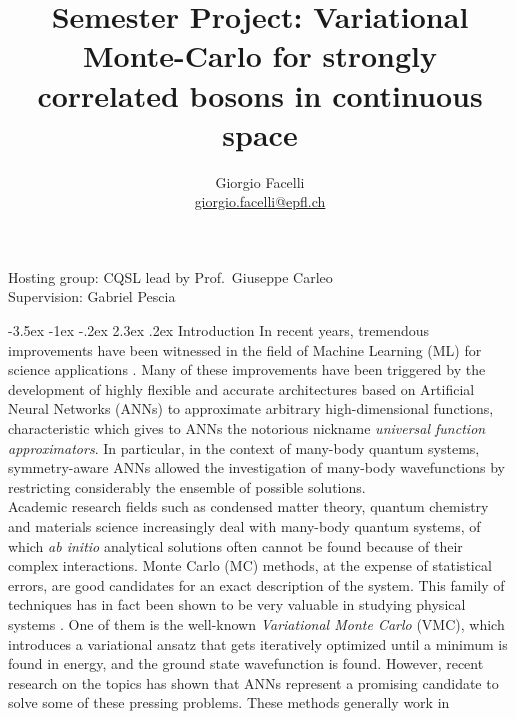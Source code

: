 \documentclass[a4paper, 12pt, oneside]{article}
\makeatletter
\renewcommand{\section}{\@startsection{section}{1}{\z@}%
             {-3.5ex \@plus-1ex \@minus-.2ex}%
             {2.3ex \@plus.2ex}%
             {\normalfont\large\bfseries}}
\newcommand{\mail}[1]{{\href{mailto:#1}{#1}}}
\makeatother
\begin{document}
\title{Semester Project: Variational Monte-Carlo for strongly correlated bosons in continuous space}
\author{Giorgio Facelli\\ 
{\small \mail{giorgio.facelli@epfl.ch}}}

\maketitle 
\begin{center}
Hosting group: CQSL lead by Prof.\ Giuseppe Carleo \\
Supervision: Gabriel Pescia
\end{center}

\baselineskip=16pt
\parindent=0pt
\parskip=12pt

\section{Introduction}
In recent years, tremendous improvements have been witnessed in the field of Machine Learning (ML) for science applications \cite{carleo_2019}. 
Many of these improvements have been triggered by the development of highly flexible and accurate architectures based on 
Artificial Neural Networks (ANNs) to approximate arbitrary high-dimensional functions, characteristic 
which gives to ANNs the notorious nickname {\it universal function approximators}. In particular, in the context of 
many-body quantum systems, symmetry-aware ANNs allowed the investigation of many-body wavefunctions by restricting 
considerably the ensemble of possible solutions. \\
Academic research fields such as condensed matter theory, quantum chemistry 
and materials science increasingly deal with many-body quantum systems, of which 
\textit{ab initio} analytical solutions often cannot be found because of their complex interactions.
Monte Carlo (MC) methods, at the expense of statistical errors, are good candidates for an exact 
description of the system. This family of techniques has in fact been shown to be very valuable in 
studying physical systems \cite{mcmillan_1965, schiff_1967,dornheim_2016, magro_1993, kroiss_2016}. 
One of them is the well-known {\it Variational Monte Carlo} (VMC), which introduces a variational 
ansatz that gets iteratively optimized until a minimum is found in energy, and the ground state 
wavefunction is found. However, recent research on the topics has shown that ANNs represent a 
promising candidate to solve some of these pressing problems. These methods generally work in 
\end{document}
